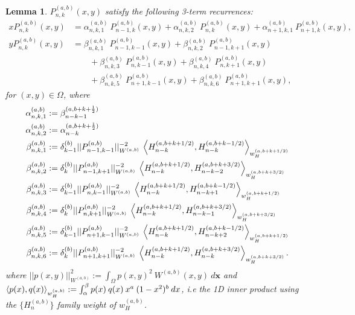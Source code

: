 \documentclass[11pt, oneside]{article}   	%
\newcommand{\half}{\frac{1}{2}}
\newcommand{\Pnk}{P_{n,k}}
\newcommand{\Wab}{{W^{(a,b)}}}
\newcommand{\alphaab}{\alpha^{(a,b)}}
\newcommand{\betaab}{\beta^{(a,b)}}
\newtheorem{lemma}{Lemma}
\begin{document}
\begin{lemma}
$\Pnk^{(a,b)}(x,y)$ satisfy the following 3-term recurrences:
\begin{align}
x \Pnk^{(a,b)}(x,y) &= \alphaab_{n,k,1} \: P_{n-1, k}^{(a,b)}(x, y) + \alphaab_{n,k,2} \: P_{n, k}^{(a,b)}(x, y) + \alphaab_{n+1,k,1} \: P_{n+1, k}^{(a,b)}(x, y), \\
y \Pnk^{(a,b)}(x,y) &= \betaab_{n,k,1} \: P_{n-1, k-1}^{(a,b)}(x, y) + \betaab_{n,k,2} \: P_{n-1, k+1}^{(a,b)}(x, y) \nonumber \\
		& \quad \quad + \betaab_{n,k,3} \: P_{n, k-1}^{(a,b)}(x, y) + \betaab_{n,k,4} \: P_{n, k+1}^{(a,b)}(x, y) \nonumber \\
		& \quad \quad + \betaab_{n,k,5} \: P_{n+1, k-1}^{(a,b)}(x, y) + \betaab_{n,k,6} \: P_{n+1, k+1}^{(a,b)}(x, y),
\end{align}
for \((x,y) \in \Omega\), where
\begin{align}
\alphaab_{n,k,1} &:= \beta_{n-k-1}^{(a, b+k+\half)} \\
\alphaab_{n,k,2} &:= \alpha_{n-k}^{(a, b+k+\half)} \\
\betaab_{n,k,1} &:= {\delta_{k-1}^{(b)}}{|| P_{n-1,k-1}^{(a,b)} ||_{W^{(a,b)}}^{-2}} \: \ip<H_{n-k}^{(a, b+k+1/2)}, H_{n-k}^{(a, b+k-1/2)}>_{w_H^{(a, b+k+1/2)}} \\
\betaab_{n,k,2} &:= {\delta_{k}^{(b)}}{|| P_{n-1,k+1}^{(a,b)} ||_{W^{(a,b)}}^{-2}} \: \ip<H_{n-k}^{(a, b+k+1/2)}, H_{n-k-2}^{(a, b+k+{3/2})}>_{w_H^{(a, b+k+{3/2})}} \\
\betaab_{n,k,3} &:= {\delta_{k-1}^{(b)}}{|| P_{n,k-1}^{(a,b)} ||_{W^{(a,b)}}^{-2}} \: \ip<H_{n-k}^{(a, b+k+1/2)}, H_{n-k+1}^{(a, b+k-1/2)}>_{w_H^{(a, b+k+1/2)}} \\
\betaab_{n,k,4} &:= {\delta_{k}^{(b)}}{|| P_{n,k+1}^{(a,b)} ||_{W^{(a,b)}}^{-2}} \: \ip<H_{n-k}^{(a, b+k+1/2)}, H_{n-k-1}^{(a, b+k+{3/2})}>_{w_H^{(a, b+k+{3/2})}} \\
\betaab_{n,k,5} &:= {\delta_{k-1}^{(b)}}{|| P_{n+1,k-1}^{(a,b)} ||_{W^{(a,b)}}^{-2}} \: \ip<H_{n-k}^{(a, b+k+1/2)}, H_{n-k+2}^{(a, b+k-1/2)}>_{w_H^{(a, b+k+1/2)}} \\
\betaab_{n,k,6} &:= {\delta_{k}^{(b)}}{|| P_{n+1,k+1}^{(a,b)} ||_{W^{(a,b)}}^{-2}} \: \ip<H_{n-k}^{(a, b+k+1/2)}, H_{n-k}^{(a, b+k+{3/2})}>_{w_H^{(a, b+k+{3/2})}}. 
\end{align}
where $|| p(x,y) ||_{W^{(a,b)}}^2 := \int_\Omega p(x,y)^2 \: \Wab(x,y) \: d\mathbf{x}$ and $\ip<p(x), q(x)>_{w_H^{(a, b)}} := \int_\alpha^\beta p(x) \: q(x) \: x^a \: (1-x^2)^b \: dx$, i.e the 1D inner product using the $\{H^{(a,b)}_n\}$ family weight of $w_H^{(a, b)}$.

\end{lemma}
\end{document}

